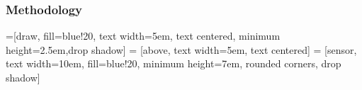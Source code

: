 \documentclass[9pt]{beamer}
\begin{document}
\begin{frame}
\frametitle{Methodology}
\label{sec-3-2}


\fontsize{9}\selectfont


=[draw, fill=blue!20, text width=5em, 
    text centered, minimum height=2.5em,drop shadow]
 = [above, text width=5em, text centered]
 = [sensor, text width=10em, fill=blue!20, 
    minimum height=7em, rounded corners, drop shadow]

\def\blockdist{2.3}
\def\edgedist{2.5}

\end{frame}
\end{document}
